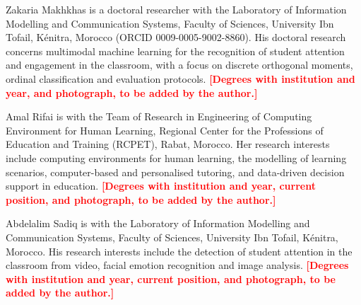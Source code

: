 \IfFileExists{ieeeaccess.cls}{\documentclass{ieeeaccess}\newif\ifaccess\accesstrue}{\documentclass[journal]{IEEEtran}\newif\ifaccess\accessfalse}
\newcommand{\pending}[1]{\textcolor{red}{\textbf{[#1]}}}
\providecommand{\EOD}{}
\begin{document}














\begin{IEEEbiographynophoto}{Zakaria Makhkhas}
is a doctoral researcher with the Laboratory of Information Modelling and Communication Systems, Faculty of Sciences, University Ibn Tofail, K\'enitra, Morocco (ORCID 0009-0005-9002-8860). His doctoral research concerns multimodal machine learning for the recognition of student attention and engagement in the classroom, with a focus on discrete orthogonal moments, ordinal classification and evaluation protocols. \pending{Degrees with institution and year, and photograph, to be added by the author.}
\end{IEEEbiographynophoto}
\begin{IEEEbiographynophoto}{Amal Rifai}
is with the Team of Research in Engineering of Computing Environment for Human Learning, Regional Center for the Professions of Education and Training (RCPET), Rabat, Morocco. Her research interests include computing environments for human learning, the modelling of learning scenarios, computer-based and personalised tutoring, and data-driven decision support in education. \pending{Degrees with institution and year, current position, and photograph, to be added by the author.}
\end{IEEEbiographynophoto}
\begin{IEEEbiographynophoto}{Abdelalim Sadiq}
is with the Laboratory of Information Modelling and Communication Systems, Faculty of Sciences, University Ibn Tofail, K\'enitra, Morocco. His research interests include the detection of student attention in the classroom from video, facial emotion recognition and image analysis. \pending{Degrees with institution and year, current position, and photograph, to be added by the author.}
\end{IEEEbiographynophoto}
\EOD
\end{document}
